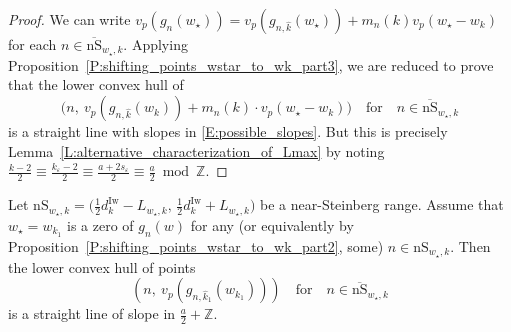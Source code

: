 \begin{proof}
    We can write $v_p(g_n(w_\star)) = v_p(g_{n,\hat k}(w_\star)) + m_n(k) v_p(w_\star -w_k)$ for each $n\in  \overline {\mathrm{nS}}_{w_\star, k} $.
    Applying Proposition~\ref{P:shifting_points_wstar_to_wk_part3}, we are reduced to prove that the lower convex hull of
    $$
    \big(n, \ v_p(g_{n, \hat k}(w_k)) + m_n(k) \cdot v_p(w_\star - w_k)\big) \quad \textrm{for} \quad n \in \overline {\mathrm{nS}}_{w_\star, k}
    $$
    is a straight line with slopes in \eqref{E:possible_slopes}. But this is precisely Lemma~\ref{L:alternative_characterization_of_Lmax} by noting $\frac{k-2}2 \equiv \frac{k_\varepsilon-2}2 \equiv \frac{a+2s_\varepsilon }2 \equiv \frac a2 \bmod {\mathbb{Z}}$.
\end{proof}

\begin{corollary}
    \label{C:near-Steinberg_gt_straightline_part2}
    Let $ {\mathrm{nS}}_{w_\star, k} = \big(\tfrac 12 d_{k}^{\mathrm{Iw}}- L_{w_\star, k},\, \tfrac 12 d_{k}^{\mathrm{Iw}}+ L_{ w_\star, k} \big)$ be a  near-Steinberg range.
    Assume that $w_\star = w_{k_1}$ is a zero of $g_n(w)$ for any (or equivalently by Proposition~\ref{P:shifting_points_wstar_to_wk_part2}, some) $n \in {\mathrm{nS}}_{w_\star, k}$. Then  the lower convex hull of points
    $$
    (n, \ v_p(g_{n,\hat k_1}(w_{k_1}))) \quad \textrm{for} \quad n \in \overline {\mathrm{nS}}_{w_\star, k}
    $$
    is a straight line of slope in $\frac a2 +{\mathbb{Z}}$.
\end{corollary}

